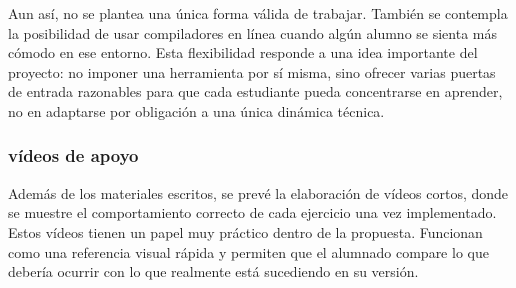 \documentclass[a4paper,12pt]{article}
\begin{document}
Aun así, no se plantea una única forma válida de trabajar. También se contempla la posibilidad de usar compiladores en línea cuando algún alumno se sienta más cómodo en ese entorno. Esta flexibilidad responde a una idea importante del proyecto: no imponer una herramienta por sí misma, sino ofrecer varias puertas de entrada razonables para que cada estudiante pueda concentrarse en aprender, no en adaptarse por obligación a una única dinámica técnica.





\subsubsection{vídeos de apoyo}

Además de los materiales escritos, se prevé la elaboración de vídeos cortos, donde se muestre el comportamiento correcto de cada ejercicio una vez implementado. Estos vídeos tienen un papel muy práctico dentro de la propuesta. Funcionan como una referencia visual rápida y permiten que el alumnado compare lo que debería ocurrir con lo que realmente está sucediendo en su versión.
\end{document}

